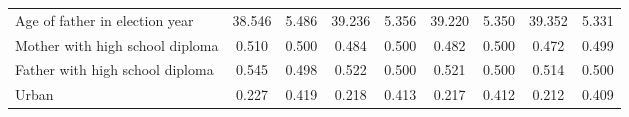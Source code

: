 \begin{landscape}
\begin{table}[]
{\begin{tabular}{l*{8}{c}}
				Age of father in election year  & 38.546  & 5.486                               & 39.236  & 5.356                              & 39.220  & 5.350                              & 39.352  & 5.331                            \\
				Mother with high school diploma & 0.510   & 0.500                               & 0.484   & 0.500                              & 0.482   & 0.500                              & 0.472   & 0.499                            \\
				Father with high school diploma & 0.545   & 0.498                               & 0.522   & 0.500                              & 0.521   & 0.500                              & 0.514   & 0.500                            \\
				Urban                           & 0.227   & 0.419                               & 0.218   & 0.413                              & 0.217   & 0.412                              & 0.212   & 0.409                            \\ \bottomrule
			\end{tabular}
		}
	\end{table}
\end{landscape}
